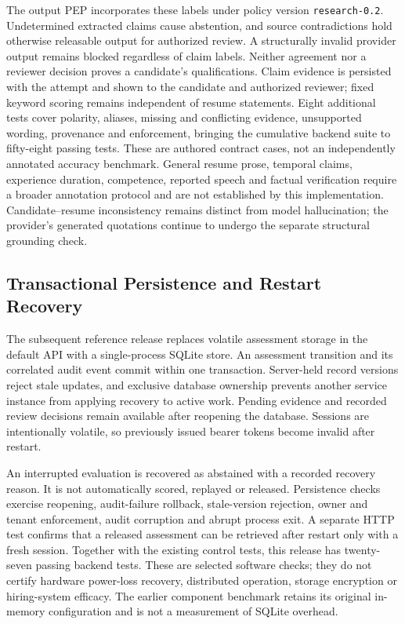 \documentclass[conference]{IEEEtran}
\begin{document}
The output PEP incorporates these labels under policy version \texttt{research-0.2}. Undetermined extracted claims cause abstention, and source contradictions hold otherwise releasable output for authorized review. A structurally invalid provider output remains blocked regardless of claim labels. Neither agreement nor a reviewer decision proves a candidate's qualifications. Claim evidence is persisted with the attempt and shown to the candidate and authorized reviewer; fixed keyword scoring remains independent of resume statements. Eight additional tests cover polarity, aliases, missing and conflicting evidence, unsupported wording, provenance and enforcement, bringing the cumulative backend suite to fifty-eight passing tests. These are authored contract cases, not an independently annotated accuracy benchmark. General resume prose, temporal claims, experience duration, competence, reported speech and factual verification require a broader annotation protocol and are not established by this implementation. Candidate--resume inconsistency remains distinct from model hallucination; the provider's generated quotations continue to undergo the separate structural grounding check.

\subsection{Transactional Persistence and Restart Recovery}

The subsequent reference release replaces volatile assessment storage in the default API with a single-process SQLite store. An assessment transition and its correlated audit event commit within one transaction. Server-held record versions reject stale updates, and exclusive database ownership prevents another service instance from applying recovery to active work. Pending evidence and recorded review decisions remain available after reopening the database. Sessions are intentionally volatile, so previously issued bearer tokens become invalid after restart.

An interrupted evaluation is recovered as abstained with a recorded recovery reason. It is not automatically scored, replayed or released. Persistence checks exercise reopening, audit-failure rollback, stale-version rejection, owner and tenant enforcement, audit corruption and abrupt process exit. A separate HTTP test confirms that a released assessment can be retrieved after restart only with a fresh session. Together with the existing control tests, this release has twenty-seven passing backend tests. These are selected software checks; they do not certify hardware power-loss recovery, distributed operation, storage encryption or hiring-system efficacy. The earlier component benchmark retains its original in-memory configuration and is not a measurement of SQLite overhead.
\end{document}
